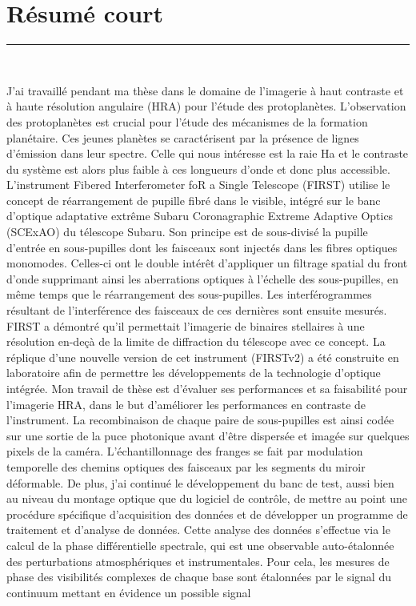 
\newpage
\thispagestyle{empty}
\chapter*{Résumé court}

\noindent\rule[2pt]{\textwidth}{0.5pt}
\begin{center}
    \large\textbf{\ttitle\\}
\end{center}
    \footnotesize J’ai travaillé pendant ma thèse dans le domaine de l’imagerie à haut contraste et à haute résolution angulaire (HRA) pour l’étude des protoplanètes. L'observation des protoplanètes est crucial pour l'étude des mécanismes de la formation planétaire. Ces jeunes planètes se caractérisent par la présence de lignes d'émission dans leur spectre. Celle qui nous intéresse est la raie Ha et le contraste du système est alors plus faible à ces longueurs d’onde et donc plus accessible. L’instrument Fibered Interferometer foR a Single Telescope (FIRST) utilise le concept de réarrangement de pupille fibré dans le visible, intégré sur le banc d’optique adaptative extrême Subaru Coronagraphic Extreme Adaptive Optics (SCExAO) du télescope Subaru. Son principe est de sous-divisé la pupille d’entrée en sous-pupilles dont les faisceaux sont injectés dans les fibres optiques monomodes. Celles-ci ont le double intérêt d’appliquer un filtrage spatial du front d’onde supprimant ainsi les aberrations optiques à l’échelle des sous-pupilles, en même temps que le réarrangement des sous-pupilles. Les interférogrammes résultant de l’interférence des faisceaux de ces dernières sont ensuite mesurés. FIRST a démontré qu’il permettait l’imagerie de binaires stellaires à une résolution en-deçà de la limite de diffraction du télescope avec ce concept. La réplique d’une nouvelle version de cet instrument (FIRSTv2) a été construite en laboratoire afin de permettre les développements de la technologie d’optique intégrée. Mon travail de thèse est d’évaluer ses performances et sa faisabilité pour l’imagerie HRA, dans le but d’améliorer les performances en contraste de l’instrument. La recombinaison de chaque paire de sous-pupilles est ainsi codée sur une sortie de la puce photonique avant d’être dispersée et imagée sur quelques pixels de la caméra. L’échantillonnage des franges se fait par modulation temporelle des chemins optiques des faisceaux par les segments du miroir déformable. De plus, j’ai continué le développement du banc de test, aussi bien au niveau du montage optique que du logiciel de contrôle, de mettre au point une procédure spécifique d’acquisition des données et de développer un programme de traitement et d’analyse de données. Cette analyse des données s’effectue via le calcul de la phase différentielle spectrale, qui est une observable auto-étalonnée des perturbations atmosphériques et instrumentales. Pour cela, les mesures de phase des visibilités complexes de chaque base sont étalonnées par le signal du continuum mettant en évidence un possible signal 